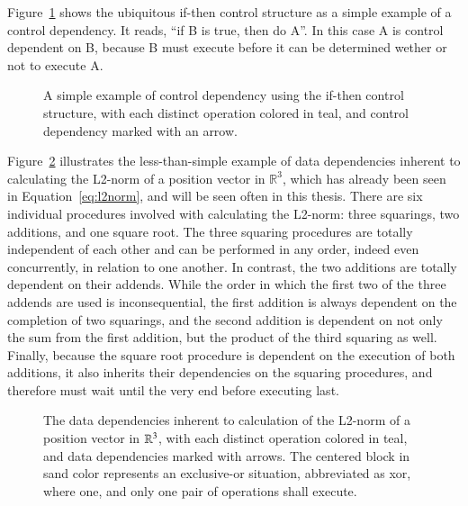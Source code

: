 Figure~\ref{fig:simpleControlDependency} shows the ubiquitous if-then control structure as a simple example of a control dependency. It reads, ``if B is true, then do A''. In this case A is control dependent on B, because B must execute before it can be determined wether or not to execute A.

\begin{figure}[ht]
	
	{\caption[If-Then Control Dependency]{A simple example of control dependency using the if-then control structure, with each distinct operation colored in teal, and control dependency marked with an arrow.}\label{fig:simpleControlDependency}}
\end{figure}

Figure~\ref{fig:dataDependencyOfL2Norm} illustrates the less-than-simple example of data dependencies inherent to calculating the L2-norm of a position vector in $\mathbb{R}^{3}$, which has already been seen in Equation~\ref{eq:l2norm}, and will be seen often in this thesis. There are six individual procedures involved with calculating the L2-norm: three squarings, two additions, and one square root. The three squaring procedures are totally independent of each other and can be performed in any order, indeed even concurrently, in relation to one another. In contrast, the two additions are totally dependent on their addends. While the order in which the first two of the three addends are used is inconsequential, the first addition is always dependent on the completion of two squarings, and the second addition is dependent on not only the sum from the first addition, but the product of the third squaring as well. Finally, because the square root procedure is dependent on the execution of both additions, it also inherits their dependencies on the squaring procedures, and therefore must wait until the very end before executing last.

\begin{figure}[ht]
	
	{\caption[Data Dependencies in the L2-norm Calculation]{The data dependencies inherent to calculation of the L2-norm of a position vector in $\mathbb{R}^{3}$, with each distinct operation colored in teal, and data dependencies marked with arrows. The centered block in sand color represents an exclusive-or situation, abbreviated as xor, where one, and only one pair of operations shall execute.}\label{fig:dataDependencyOfL2Norm}}
\end{figure}

